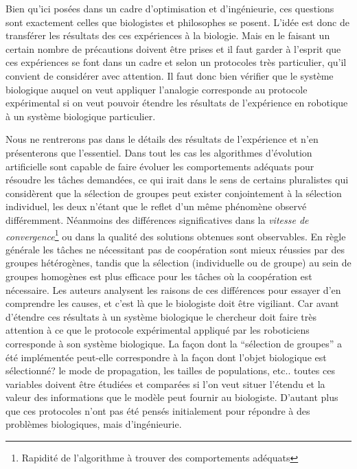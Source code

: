 Bien qu'ici posées dans un cadre d'optimisation et d'ingénieurie, ces questions sont exactement celles que biologistes et philosophes se posent. L'idée est donc de transférer les résultats des ces expériences à la biologie. Mais en le faisant un certain nombre de précautions doivent être prises et il faut garder à l'esprit que ces expériences se font dans un cadre et selon un protocoles très particulier, qu'il convient de considérer avec attention. Il faut donc bien vérifier que le système biologique auquel on veut appliquer l'analogie corresponde au protocole expérimental si on veut pouvoir étendre les résultats de l'expérience en robotique à un système biologique particulier.  


Nous ne rentrerons pas dans le détails des résultats de l'expérience et n'en présenterons que l'essentiel. Dans tout les cas les algorithmes d'évolution artificielle sont capable de faire évoluer les comportements adéquats pour résoudre les t\^aches demandées, ce qui irait dans le sens de certains pluralistes qui considèrent que la sélection de groupes peut exister conjointement à la sélection individuel, les deux n'étant que le reflet d'un même phénomène observé différemment. 
Néanmoins des différences significatives dans la \emph{vitesse de convergence}\footnote{Rapidité de l'algorithme à trouver des comportements adéquats} ou dans la qualité des solutions obtenues sont observables. En règle générale les tâches ne nécessitant pas de coopération sont mieux réussies par des groupes hétérogènes, tandis que la sélection (individuelle ou de groupe) au sein de groupes homogènes est plus efficace pour les tâches où la coopération est nécessaire. Les auteurs analysent les raisons de ces différences pour essayer d'en comprendre les causes, et c'est là que le biologiste doit être vigiliant. Car avant d'étendre ces résultats à un système biologique le chercheur doit faire très attention à ce que le protocole expérimental appliqué par les roboticiens corresponde à son système biologique. La façon dont la ``sélection de groupes'' a été implémentée peut-elle correspondre à la façon dont l'objet biologique est sélectionné? le mode de propagation, les tailles de populations, etc.. toutes ces variables doivent être étudiées et comparées si l'on veut situer l'étendu et la valeur des informations que le modèle peut fournir au biologiste. D'autant plus que ces protocoles n'ont pas été pensés initialement pour répondre à des problèmes biologiques, mais d'ingénieurie.




